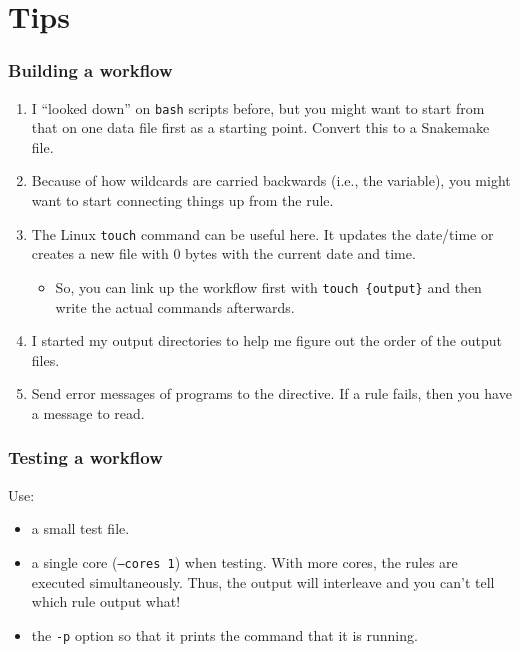 \section{Tips}


\begin{frame}

\frametitle{Building a workflow}

\begin{enumerate}
  \item I ``looked down'' on {\texttt{bash}} scripts before, but you might want to start from that on one data file first as a starting point.  Convert this to a Snakemake file.
  \item Because of how wildcards are carried backwards (i.e., the {} variable), you might want to start connecting things up from the {} rule.
  \item The Linux {\texttt{touch}} command can be useful here.  It updates the date/time or creates a new file with 0 bytes with the current date and time.
    \begin{itemize}
      \item So, you can link up the workflow first with {\texttt{touch \{output\}}} and then write the actual commands afterwards.
    \end{itemize}
  \item I started {} my output directories to help me figure out the order of the output files.
  \item Send error messages of programs to the {} directive.  If a rule fails, then you have a message to read.
\end{enumerate}

\end{frame}


\begin{frame}

\frametitle{Testing a workflow}

Use:
\begin{itemize}
  \item a small test file.
  \item a single core ({\texttt{--cores 1}}) when testing.  With more cores, the rules are executed simultaneously.  Thus, the output will interleave and you can't tell which rule output what!
  \item the {\texttt{-p}} option so that it prints the command that it is running.
\end{itemize}

\end{frame}


